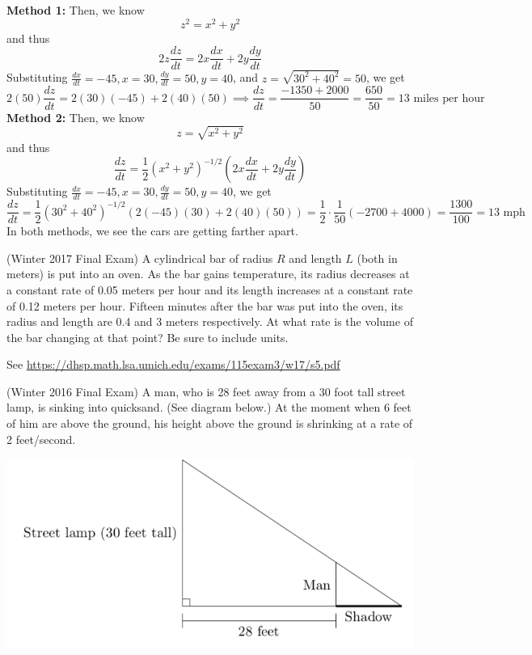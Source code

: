 \documentclass[11pt]{exam}
\begin{document}
\begin{questions}
\begin{solution}
      \textbf{Method 1:} Then, we know \[
        z^2 = x^2 + y^2
      \]
      and thus \[
        2z\frac{dz}{dt}  = 2x\frac{dx}{dt} + 2y\frac{dy}{dt}
      \]
      Substituting \(\frac{dx}{dt} = -45, x=30, \frac{dy}{dt} = 50,
      y=40\), and \(z = \sqrt{30^2+40^2} = 50\), we get \[
        2(50) \frac{dz}{dt} = 2(30)(-45) + 2(40)(50)
        \implies\frac{dz}{dt}  = \frac{-1350+2000}{50} =
        \frac{650}{50} = 13 \text{ miles per hour}
      \]
      \textbf{Method 2:} Then, we know \[
        z = \sqrt{x^2+y^2}
      \]
      and thus \[
        \frac{dz}{dt} = \frac{1}{2} (x^2+y^2)^{-1/2}\left(2x\frac{dx}{dt}+2y\frac{dy}{dt}\right)
      \]
      Substituting \(\frac{dx}{dt} = -45, x=30, \frac{dy}{dt} = 50,
      y=40\), we get \[
        \frac{dz}{dt} = \frac{1}{2}
        (30^2+40^2)^{-1/2}\left(2(-45)(30)+2(40)(50)\right)
        =\frac{1}{2}\cdot \frac{1}{50}(-2700+4000) = \frac{1300}{100}
       = 13\text{ mph}
      \]
      In both methods, we see the cars are getting farther apart.
    \end{solution}
\question (Winter 2017 Final Exam) %
A cylindrical bar of radius $R$ and length $L$ (both in meters) is put into an oven. As the bar gains temperature, its radius decreases at a constant rate of 0.05 meters per hour and its length increases at a constant rate of 0.12 meters per hour. Fifteen minutes after the bar was put into the oven, its radius and length are 0.4 and 3 meters respectively. At what rate is the volume of the bar changing at that point? Be sure to include units.
\begin{solution}
  See \href{https://dhsp.math.lsa.umich.edu/exams/115exam3/w17/s5.pdf}{https://dhsp.math.lsa.umich.edu/exams/115exam3/w17/s5.pdf}
\end{solution}
\question (Winter 2016 Final Exam) %
A man, who is 28 feet away from a 30 foot tall street lamp, is sinking into quicksand. (See diagram below.) At the moment when 6 feet of him are above the ground, his height above the ground is shrinking at a rate of 2 feet/second.
\begin{center}
\includegraphics[scale=0.5]{shadow.png}

\end{center}
\end{questions}
\end{document}
